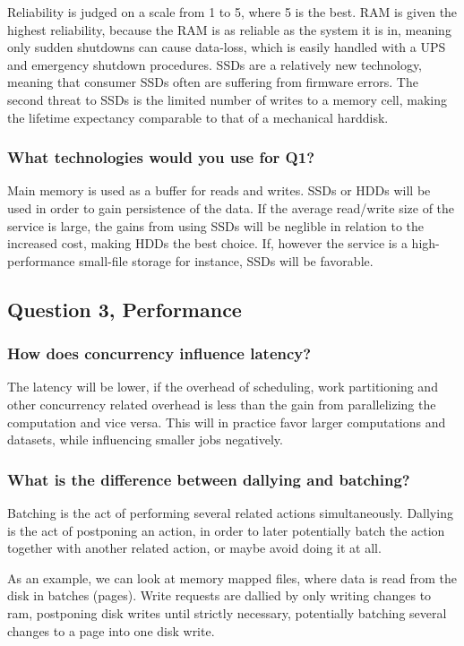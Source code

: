 \documentclass[11pt,a4paper]{article}
\begin{document}
Reliability is judged on a scale from 1 to 5, where 5 is the best.
RAM is given the highest reliability, because the RAM is as reliable
as the system it is in, meaning only sudden shutdowns can cause data-loss,
which is easily handled with a UPS and emergency shutdown procedures.
SSDs are a relatively new technology, meaning that consumer SSDs often
are suffering from firmware errors. The second threat to SSDs is the limited
number of writes to a memory cell, making the lifetime expectancy comparable
to that of a mechanical harddisk.

\subsubsection{What technologies would you use for Q1?}
Main memory is used as a buffer for reads and writes. SSDs or HDDs will be used in order to gain persistence of the data.
If the average read/write size of the service is large, the gains from using SSDs will be neglible in relation to the increased cost,
making HDDs the best choice. If, however the service is a high-performance small-file storage for instance, SSDs will be favorable.


\subsection{Question 3, Performance}
\subsubsection{How does concurrency influence latency?}

The latency will be lower, if the overhead of scheduling, work partitioning and
other concurrency related overhead is less than the gain from parallelizing the
computation and vice versa. This will in practice favor larger computations and
datasets, while influencing smaller jobs negatively.

\subsubsection{What is the difference between dallying and batching?}

Batching is the act of performing several related actions simultaneously.
Dallying is the act of postponing an action, in order to later potentially batch
the action together with another related action, or maybe avoid doing it at all.

As an example, we can look at memory mapped files, where data is read from the
disk in batches (pages).
Write requests are dallied by only writing changes to ram, postponing disk
writes until strictly necessary, potentially batching several changes to a page
into one disk write.
\end{document}

